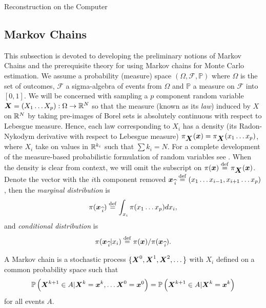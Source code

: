 \begin{chapter}{Reconstruction on the Computer}
  \subsection{Markov Chains}
This subsection is devoted to developing the preliminary notions of Markov Chains and the prerequisite theory for using Markov chains for Monte Carlo estimation. 
We assume a probability (measure) space $(\Omega,\mathcal F,\mathbb P)$ where $\Omega$ is the set of outcomes, $\mathcal F$ a sigma-algebra of events from $\Omega$ and $\mathbb P$ a measure on $\mathcal F$ into $[0,1]$.
We will be concerned with sampling a $p$ component random variable $\mbox{\boldmath$X$} = (X_1\dots X_p):\Omega \to \mathbb R^N$ so that the measure (known as its \emph{law}) induced by $X$ on $\mathbb R^N$ by taking pre-images of Borel sets is absolutely continuous with respect to Lebesgue measure.
Hence, each law corresponding to $X_i$ has a density (its Radon-Nykodym derivative with respect to Lebesgue measure) $\pi_{\mbox{\boldmath$X$}}(\mbox{\boldmath$x$}) = \pi_{\mbox{\boldmath$X$}}(x_1\dots x_p)$, where $X_i$ take on values in $\mathbb R^{k_i}$ such that $\sum k_i = N$.
For a complete development of the measure-based probabilistic formulation of random variables see \citep{durrett2010probability,billingsley2008probability}.
When the density is clear from context, we will omit the subscript on $\pi(\mbox{\boldmath$x$}) \stackrel{\rm def}{=} \pi_{\mbox{\boldmath$X$}}(\mbox{\boldmath$x$})$.
Denote the vector with the $i$th component removed $\mbox{\boldmath$x$}_{\,\widehat{i}} \stackrel{\rm def}{=} (x_1\dots x_{i-1},x_{i+1}\dots x_p)$, then the \emph{marginal distribution} is
\begin{equation}
  \pi(\mbox{\boldmath$x$}_{\,\widehat{i}}) \stackrel{\rm def}{=} \int_{x_i} \pi(x_1\dots x_p)dx_i,
\end{equation}
and \emph{conditional distribution} is
\begin{equation}
  \pi(\mbox{\boldmath$x$}_{\,\widehat{i}}| x_i) \stackrel{\rm def}{=} \pi(\mbox{\boldmath$x$})/\pi(\mbox{\boldmath$x$}_{\,\widehat{i}}).
\end{equation}
  
A Markov chain is a stochastic process $\{\mbox{\boldmath$X$}^0, \mbox{\boldmath$X$}^1,\mbox{\boldmath$X$}^2,\dots\}$ with $X_i$ defined on a common probability space such that
\begin{equation} \label{eq:markovCondition}
  \mathbb P\left( \mbox{\boldmath$X$}^{k+1} \in A | \mbox{\boldmath$X$}^k= \mbox{\boldmath$x$}^k,\dots \mbox{\boldmath$X$}^0=\mbox{\boldmath$x$}^0\right) 
    = \mathbb P\left( \mbox{\boldmath$X$}^{k+1} \in A | \mbox{\boldmath$X$}^k= \mbox{\boldmath$x$}^k\right) 
\end{equation}
for all events $A$.  
  

\end{chapter}
